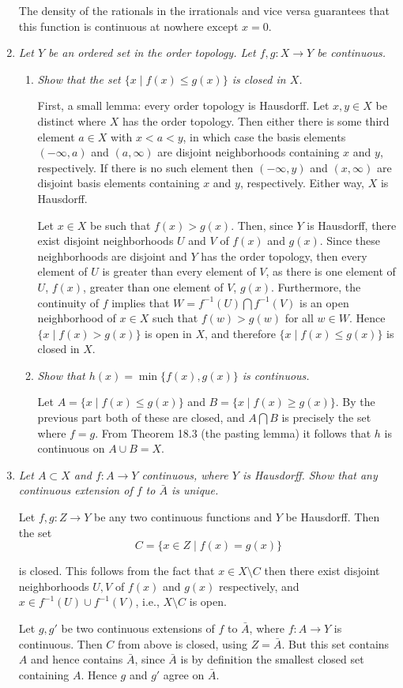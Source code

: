 \documentclass[11pt]{article}
\begin{document}
\begin{enumerate}
The density of the rationals in the irrationals and vice versa guarantees that this function is continuous at nowhere except $x=0$.

\item \emph{Let $Y$ be an ordered set in the order topology.  Let $f,g: X \rightarrow Y$ be continuous.}
\begin{enumerate}
\item \emph{Show that the set $\{x \mid f(x) \leq g(x)\}$ is closed in $X$.}

First, a small lemma: every order topology is Hausdorff.  Let $x,y \in X$ be distinct where $X$ has the order topology.  Then either there is some third element $a \in X$ with $x < a < y$, in which case the basis elements $(-\infty,a)$ and $(a, \infty)$ are disjoint neighborhoods containing $x$ and $y$, respectively.  If there is no such element then $(-\infty, y)$ and $(x, \infty)$ are disjoint basis elements containing $x$ and $y$, respectively.  Either way, $X$ is Hausdorff.

Let $x \in X$ be such that $f(x) > g(x)$.  Then, since $Y$ is Hausdorff, there exist disjoint neighborhoods $U$ and $V$ of $f(x)$ and $g(x)$.  Since these neighborhoods are disjoint and $Y$ has the order topology, then every element of $U$ is greater than every element of $V$, as there is one element of $U$, $f(x)$, greater than one element of $V$, $g(x)$.  Furthermore, the continuity of $f$ implies that $W = f^{-1}(U) \bigcap f^{-1}(V)$ is an open neighborhood of $x \in X$ such that $f(w) > g(w)$ for all $w \in W$.  Hence $\{x \mid f(x) > g(x)\}$ is open in $X$, and therefore $\{x \mid f(x) \leq g(x)\}$ is closed in $X$.

\item \emph{Show that $h(x) = \min\{f(x), g(x)\}$ is continuous.}

Let $A = \{x \mid f(x) \leq g(x)\}$ and $B = \{x \mid f(x) \geq g(x)\}$.  By the previous part both of these are closed, and $A \bigcap B$ is precisely the set where $f = g$.  From Theorem 18.3 (the pasting lemma) it follows that $h$ is continuous on $A \cup B = X$.

\end{enumerate}

\item \emph{Let $A \subset X$ and $f: A \rightarrow Y$ continuous, where $Y$ is Hausdorff.  Show that any continuous extension of $f$ to $\bar{A}$ is unique.}

Let $f,g: Z \rightarrow Y$ be any two continuous functions and $Y$ be Hausdorff.  Then the set
\[
C = \{x \in Z \mid f(x) = g(x)\}
\]

is closed.  This follows from the fact that $x \in X \setminus C$ then there exist disjoint neighborhoods $U, V$ of $f(x)$ and $g(x)$ respectively, and $x \in f^{-1}(U) \cup f^{-1}(V)$, i.e., $X \setminus C$ is open.

Let $g, g'$ be two continuous extensions of $f$ to $\bar{A}$, where $f: A \rightarrow Y$ is continuous.  Then $C$ from above is closed, using $Z = \bar{A}$.  But this set contains $A$ and hence contains $\bar{A}$, since $\bar{A}$ is by definition the smallest closed set containing $A$.  Hence $g$ and $g'$ agree on $\bar{A}$.

\end{enumerate}
\end{document}
